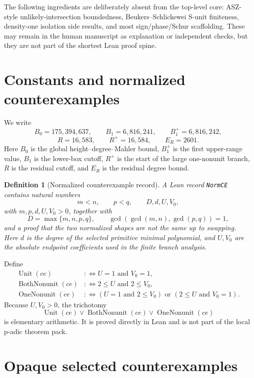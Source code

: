 \documentclass[11pt]{article}
\newtheorem{definition}{Definition}
\begin{document}
The following ingredients are deliberately absent from the top-level core:
ASZ-style unlikely-intersection boundedness, Beukers--Schlickewei S-unit
finiteness, density-one isolation side results, and most sign/phase/Schur
scaffolding.  These may remain in the human manuscript as explanation or
independent checks, but they are not part of the shortest Lean proof spine.

\section{Constants and normalized counterexamples}

We write
\[
B_0=175{,}394{,}637,
\qquad
B_1=6{,}816{,}241,
\qquad
B_1^+=6{,}816{,}242,
\]
\[
R=16{,}583,
\qquad
R^+=16{,}584,
\qquad
E_R=2601.
\]
Here $B_0$ is the global height--degree--Mahler bound, $B_1^+$ is the first
upper-range value, $B_1$ is the lower-box cutoff, $R^+$ is the start of the
large one-nonunit branch, $R$ is the residual cutoff, and $E_R$ is the residual
degree bound.

\begin{definition}[Normalized counterexample record]
A Lean record \verb|NormCE| contains natural numbers
\[
 m<n,
 \qquad p<q,
 \qquad D,d,U,V_0,
\]
with $m,p,d,U,V_0>0$, together with
\[
D=\max\{m,n,p,q\},
\qquad
\gcd(\gcd(m,n),\gcd(p,q))=1,
\]
and a proof that the two normalized shapes are not the same up to swapping.
Here $d$ is the degree of the selected primitive minimal polynomial, and
$U,V_0$ are the absolute endpoint coefficients used in the finite branch
analysis.
\end{definition}

Define
\[
\begin{aligned}
\operatorname{Unit}(ce)&:\Longleftrightarrow U=1\text{ and }V_0=1,\\
\operatorname{BothNonunit}(ce)&:\Longleftrightarrow 2\leq U\text{ and }2\leq V_0,\\
\operatorname{OneNonunit}(ce)&:\Longleftrightarrow
   (U=1\text{ and }2\leq V_0)\text{ or }(2\leq U\text{ and }V_0=1).
\end{aligned}
\]
Because $U,V_0>0$, the trichotomy
\[
\operatorname{Unit}(ce)\vee \operatorname{BothNonunit}(ce)\vee
\operatorname{OneNonunit}(ce)
\]
is elementary arithmetic.  It is proved directly in Lean and is not part of the
local p-adic theorem pack.

\section{Opaque selected counterexamples}
\end{document}
